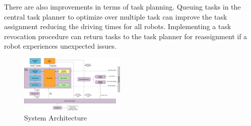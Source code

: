 \documentclass[journal]{IEEEtran}
\begin{document}
There are also improvements in terms of task planning. Queuing tasks in the central task planner to optimize over multiple task can improve the task assignment reducing the driving times for all robots. Implementing a task revocation procedure can return tasks to the task planner for reassignment if a robot experiences unexpected issues.


\begin{figure}[h!]
	\centering
	\includegraphics[width=0.45\textwidth]{resources/system_architecture}
	\caption{System Architecture}
	\label{fig:system_architecture}
\end{figure}





\end{document}
